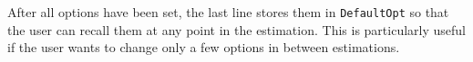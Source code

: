 \documentclass[11pt,letterpaper]{paper}
\newcommand{\pkg}[1]{{\normalfont\fontseries{b}\selectfont #1}}
\begin{document}
%

After all options have been set, the last line 
stores them in \verb|DefaultOpt| so that the user can recall them at any point in the estimation. This is particularly useful if the user wants to change only a few options in between estimations.





% 

\end{document}
